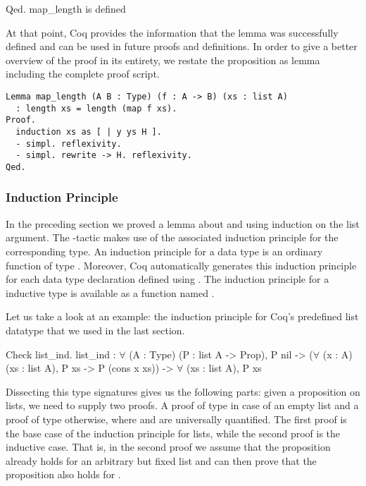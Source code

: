 \begin{cproof}{Qed.}
  map_length is defined
\end{cproof}

At that point, Coq provides the information that the lemma  was successfully defined and can be used in future proofs and definitions.
In order to give a better overview of the proof in its entirety, we restate the proposition as lemma including the complete proof script.

\begin{verbatim}
Lemma map_length (A B : Type) (f : A -> B) (xs : list A)
  : length xs = length (map f xs).
Proof.
  induction xs as [ | y ys H ].
  - simpl. reflexivity.
  - simpl. rewrite -> H. reflexivity.
Qed.
\end{verbatim}

\subsubsection{Induction Principle}
\label{subsub:induction}

In the preceding section we proved a lemma about  and  using induction on the list argument.
The -tactic makes use of the associated induction principle for the corresponding type.
An induction principle for a data type is an ordinary function of type .
Moreover, Coq automatically generates this induction principle for each data type declaration defined using .
The induction principle for a inductive type  is available as a function named .

Let us take a look at an example: the induction principle for Coq's predefined list datatype that we used in the last section.

\begin{crepl}
\coqrepl Check list_ind.
  list_ind : \(\forall\) (A : Type) (P : list A -> Prop),
    P nil ->
    (\(\forall\) (x : A) (xs : list A), P xs -> P (cons x xs)) ->
    \(\forall\) (xs : list A), P xs
\end{crepl}

Dissecting this type signatures gives us the following parts: given a proposition  on lists, we need to supply two proofs.
A proof of type  in case of an empty list and a proof of type  otherwise, where  and  are universally quantified.
The first proof is the base case of the induction principle for lists, while the second proof is the inductive case.
That is, in the second proof we assume that the proposition already holds for an arbitrary but fixed list  and can then prove that the proposition also holds for .

